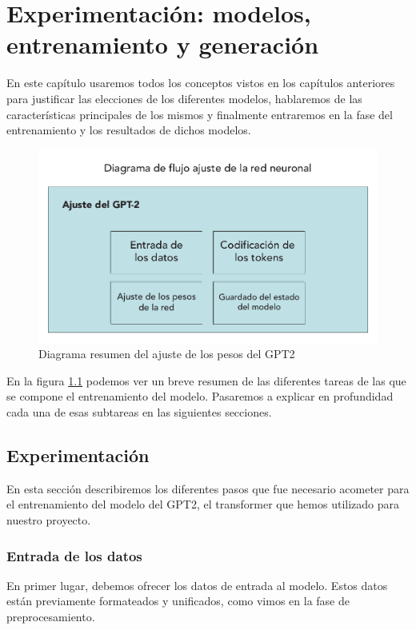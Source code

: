 \chapter{Experimentación: modelos, \\entrenamiento y generación}

En este capítulo usaremos todos los conceptos vistos en los capítulos anteriores para justificar las elecciones de los diferentes modelos, hablaremos de las características principales de los mismos y finalmente entraremos en la fase del entrenamiento y los resultados de dichos modelos.

\begin{figure}[h]
	\centering
	\includegraphics[width=.9\textwidth]{media/gpt-fine-tune.pdf}
	\caption{Diagrama resumen del ajuste de los pesos del GPT2}
	\label{fig:fine-tune-gpt}
\end{figure}

En la figura \ref{fig:fine-tune-gpt} podemos ver un breve resumen de las diferentes tareas de las que se compone el entrenamiento del modelo. Pasaremos a explicar en profundidad cada una de esas subtareas en las siguientes secciones.


\section{Experimentación}
En esta sección describiremos los diferentes pasos que fue necesario acometer para el entrenamiento del modelo del GPT2, el transformer que hemos utilizado para nuestro proyecto.

\subsection{Entrada de los datos}
En primer lugar, debemos ofrecer los datos de entrada al modelo. Estos datos están previamente formateados y unificados, como vimos en la fase de preprocesamiento.

